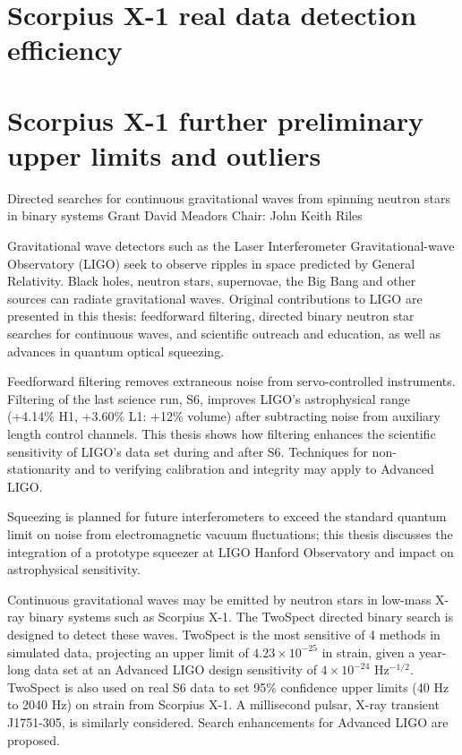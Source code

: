 \documentclass[leqno,twoside]{report}
\theoremstyle{plain}
\theoremstyle{definition}
\theoremstyle{remark}
\numberwithin{theorem}{chapter}        %
\begin{document}
\chapter{Scorpius X-1 real data detection efficiency}
\label{appendix2}

\chapter{Scorpius X-1 further preliminary upper limits and outliers}
\label{appendix3}





\startabstractpage
{Directed searches for continuous gravitational waves from spinning neutron stars in binary systems } {Grant David Meadors} {Chair: John Keith Riles}

Gravitational wave detectors such as the Laser Interferometer Gravitational-wave Observatory (LIGO) seek to observe ripples in space predicted by General Relativity. 
Black holes, neutron stars, supernovae, the Big Bang and other sources can radiate gravitational waves.
Original contributions to LIGO are presented in this thesis: feedforward filtering, directed binary neutron star searches for continuous waves, and scientific outreach and education, as well as advances in quantum optical squeezing.

Feedforward filtering removes extraneous noise from servo-controlled instruments.
Filtering of the last science run, S6, improves LIGO's astrophysical range (+4.14\% H1, +3.60\% L1: +12\% volume) after subtracting noise from auxiliary length control channels.
This thesis shows how filtering enhances the scientific sensitivity of LIGO's data set during and after S6.
Techniques for non-stationarity and to verifying calibration and integrity may apply to Advanced LIGO.

Squeezing is planned for future interferometers to exceed the standard quantum limit on noise from electromagnetic vacuum fluctuations; this thesis discusses the integration of a prototype squeezer at LIGO Hanford Observatory and impact on astrophysical sensitivity.  

Continuous gravitational waves may be emitted by neutron stars in low-mass X-ray binary systems such as Scorpius X-1.
The TwoSpect directed binary search is designed to detect these waves.
TwoSpect is the most sensitive of 4 methods in simulated data, projecting an upper limit of $4.23\times 10^{-25}$ in strain, given a year-long data set at an Advanced LIGO design sensitivity of $4\times 10^{-24}$ Hz$^{-1/2}$.
TwoSpect is also used on real S6 data to set 95\% confidence upper limits (40 Hz to 2040 Hz) on strain from Scorpius X-1.
A millisecond pulsar, X-ray transient J1751-305, is similarly considered.
Search enhancements for Advanced LIGO are proposed.
\end{document}
